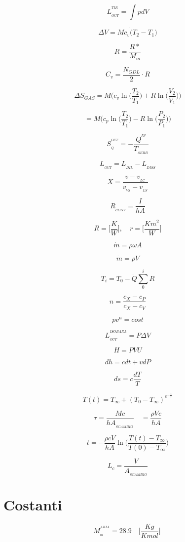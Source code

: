 \documentclass[10pt,portrait,a4paper]{article}
\begin{document}
\begin{multicols}{2}
		


\[L_{_{OUT}}^{^{TIR}}=\int pdV \]

\[\Delta V=Mc_{v}\dot (T_{2}-T_{1}) \]

\[R=\frac {R*}{M_{m}}\]

\[C_{v}=\frac{N_{GDL}}{2}\cdot R\]

\[\Delta S_{GAS} = M\bigg( c_v \ln \bigg( \frac{T_2}{T_1} \bigg)
		+R \ln \bigg( \frac{V_2}{V_1} \bigg) \bigg) \] \par
\[ = M\bigg( c_p \ln \bigg( \frac{T_2}{T_1} \bigg)
		- R \ln \bigg( \frac{P_2}{P_1} \bigg) \bigg)\]

\[ S_{_Q}^{^{OUT}}= - \frac{Q^{^{IN}}}{T_{_{SERB}}} \]

\[L_{_{OUT}}= L_{_{DIL}}- L_{_{DISS}} \]

\[ X =\frac{v - v_{_{LC}}}{v_{_{VS}} - v_{_{LS}}}\]


\[ R_{_{CONV}} =\frac{I}{hA}\]
	
\[ R = \Big [\frac {K}{W}\Big ], \quad  r =\Big [\frac{Km^{2}}{W} \Big ]\]



\[ \dot m = \rho \omega A \]

\[ \dot m = \rho V \]


\[ T_{i} = T_{0} - \dot Q \sum _{0}^{i} R \]	

\[ n = \frac {c_{X} - c_{P}}       {c_{X} - c_{V}} \]

\[pv^{n} = cost  \]

\[L_{_{OUT}}^{^{ISOBARA}}= P \Delta V \]

\[ H = PVU \]

\[ dh = cdt + vdP \]
	
\[ds= c \frac{dT}{T}\]

\[T(t) = T_{\infty} + (T_{0}-T_{\infty})^{e^{- \frac {t}{T}} }\]

\[ \tau = \frac {Mc}{hA_{_{SCAMBIO}}} \quad   = \frac{\rho Vc}{hA} \]

\[t = -  \frac {\rho cV}{hA} \ln \bigg ( \frac {T(t)-T_{\infty}}{T(0)-T_{\infty}}  \bigg )\]

\[ L_{c} = \frac {V}{A_{_{SCAMBIO}}} \]

\section{Costanti}


\[ M_{_{m}}^{^{ARIA}} = 28.9 \quad \Big [ \frac {Kg}{Kmol} \Big ] \ \]


\end{multicols}
\end{document}
